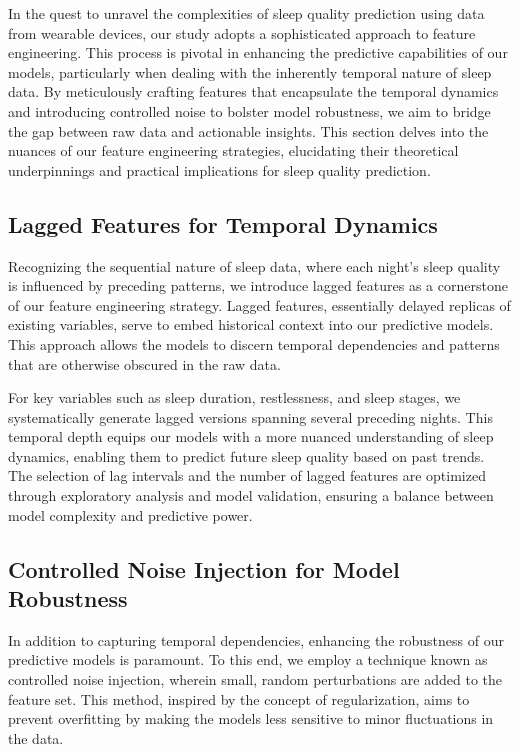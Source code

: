 \documentclass[10pt]{extarticle}
\begin{document}
In the quest to unravel the complexities of sleep quality prediction using data from wearable devices, our study adopts a sophisticated approach to feature engineering. This process is pivotal in enhancing the predictive capabilities of our models, particularly when dealing with the inherently temporal nature of sleep data. By meticulously crafting features that encapsulate the temporal dynamics and introducing controlled noise to bolster model robustness, we aim to bridge the gap between raw data and actionable insights. This section delves into the nuances of our feature engineering strategies, elucidating their theoretical underpinnings and practical implications for sleep quality prediction.

\subsection{Lagged Features for Temporal Dynamics}

Recognizing the sequential nature of sleep data, where each night's sleep quality is influenced by preceding patterns, we introduce lagged features as a cornerstone of our feature engineering strategy. Lagged features, essentially delayed replicas of existing variables, serve to embed historical context into our predictive models. This approach allows the models to discern temporal dependencies and patterns that are otherwise obscured in the raw data.

For key variables such as sleep duration, restlessness, and sleep stages, we systematically generate lagged versions spanning several preceding nights. This temporal depth equips our models with a more nuanced understanding of sleep dynamics, enabling them to predict future sleep quality based on past trends. The selection of lag intervals and the number of lagged features are optimized through exploratory analysis and model validation, ensuring a balance between model complexity and predictive power.

\subsection{Controlled Noise Injection for Model Robustness}

In addition to capturing temporal dependencies, enhancing the robustness of our predictive models is paramount. To this end, we employ a technique known as controlled noise injection, wherein small, random perturbations are added to the feature set. This method, inspired by the concept of regularization, aims to prevent overfitting by making the models less sensitive to minor fluctuations in the data.
\end{document}
